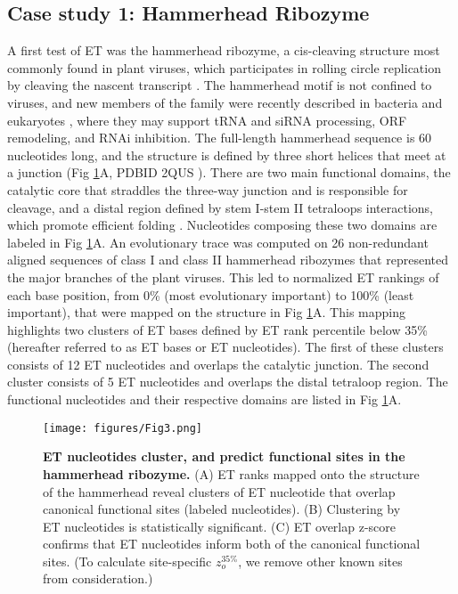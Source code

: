 \documentclass[12pt,a4paper]{report}
\begin{document}
\subsection{Case study 1: Hammerhead Ribozyme}
A first test of ET was the hammerhead ribozyme, a cis-cleaving structure most commonly found in plant viruses, which participates in rolling circle replication by cleaving the nascent transcript \cite{Hammann2012, Fedor2009}. The hammerhead motif is not confined to viruses, and new members of the family were recently described in bacteria and eukaryotes \cite{Hammann2012}, where they may support tRNA and siRNA processing, ORF remodeling, and RNAi inhibition. The full-length hammerhead sequence is 60 nucleotides long, and the structure is defined by three short helices that meet at a junction (Fig \ref{fig:rfam_hh_main}A, PDBID 2QUS \cite{Chi2008}). There are two main functional domains, the catalytic core that straddles the three-way junction and is responsible for cleavage, and a distal region defined by stem I-stem II tetraloops interactions, which promote efficient folding \cite{Khvorova2003}. Nucleotides composing these two domains are labeled in Fig \ref{fig:rfam_hh_main}A. An evolutionary trace was computed on 26 non-redundant aligned sequences of class I and class II hammerhead ribozymes that represented the major branches of the plant viruses. This led to normalized ET rankings of each base position, from 0\% (most evolutionary important) to 100\% (least important), that were mapped on the structure in Fig \ref{fig:rfam_hh_main}A. This mapping highlights two clusters of ET bases defined by ET rank percentile below 35\% (hereafter referred to as ET bases or ET nucleotides). The first of these clusters consists of 12 ET nucleotides and overlaps the catalytic junction. The second cluster consists of 5 ET nucleotides and overlaps the distal tetraloop region. The functional nucleotides and their respective domains are listed in Fig \ref{fig:rfam_hh_main}A.


\begin{figure}
\begin{minipage}[c][\textheight]{\textwidth}
\vspace*{-0.5in}
\centering
  \texttt{[image: figures/Fig3.png]} %
  \caption[ET nucleotides cluster, and predict functional sites in the hammerhead ribozyme. ]{\textbf{ET nucleotides cluster, and predict functional sites in the hammerhead ribozyme.}  (A) ET ranks mapped onto the structure of the hammerhead reveal clusters of ET nucleotide that overlap canonical functional sites (labeled nucleotides). (B) Clustering by ET nucleotides is statistically significant. (C) ET overlap z-score confirms that ET nucleotides inform both of the canonical functional sites. (To calculate site-specific $z_{o}^{35\%}$, we remove other known sites from consideration.)
}
  \label{fig:rfam_hh_main}
  \end{minipage}
\end{figure}
\end{document}
